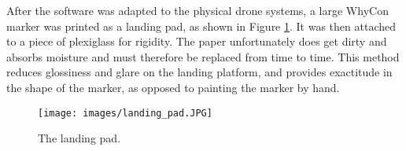 After the software was adapted to the physical drone systems, a large WhyCon marker was printed as a landing pad, as shown in Figure \ref{fig:landing_pad}. It was then attached to a piece of plexiglass for rigidity. The paper unfortunately does get dirty and absorbs moisture and must therefore be replaced from time to time. This method reduces glossiness and glare on the landing platform, and provides exactitude in the shape of the marker, as opposed to painting the marker by hand.

\begin{figure}
    \centering
    \texttt{[image: images/landing\_pad.JPG]}
    \caption{The landing pad.}
    \label{fig:landing_pad}
\end{figure}